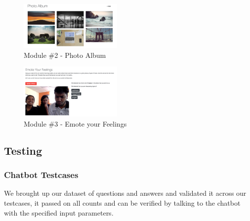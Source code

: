\documentclass[conference,compsoc]{IEEEtran}
\begin{document}
\begin{figure}[H]
    \centering
    \includegraphics[width=5cm]{images/screenshots/website/website-photo-album.png}
    \caption{Module \#2 - Photo Album}
\end{figure}

\begin{figure}[H]
    \centering
    \includegraphics[width=5cm]{images/screenshots/website/website-emote-feelings.png}
    \caption{Module \#3 - Emote your Feelings}
\end{figure}

\subsection{Testing}

\subsubsection{Chatbot Testcases}

\noindent
We brought up our dataset of questions and answers and validated it across our testcases, it passed on all counts and can be verified by talking to the chatbot with the specified input parameters.
\end{document}

